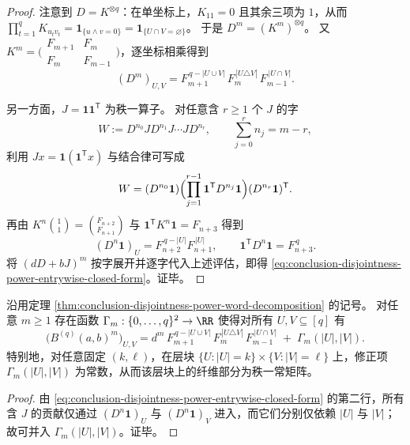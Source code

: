 \begin{proof}
注意到 \(D=K^{\otimes q}\)：在单坐标上，\(K_{11}=0\) 且其余三项为 \(1\)，从而
\(
\prod_{t=1}^{q}K_{u_t v_t}=\mathbf 1_{\{u\wedge v=0\}}=\mathbf 1_{\{U\cap V=\varnothing\}}
\)。
于是 \(D^m=(K^m)^{\otimes q}\)。
又 \(K^m=\bigl(\begin{smallmatrix}F_{m+1}&F_m\\[2pt]F_m&F_{m-1}\end{smallmatrix}\bigr)\)，逐坐标相乘得到
\[
(D^m)_{U,V}=F_{m+1}^{\,q-|U\cup V|}\,F_{m}^{\,|U\triangle V|}\,F_{m-1}^{\,|U\cap V|}.
\]
\par
另一方面，\(J=\mathbf 1\mathbf 1^{\mathsf T}\) 为秩一算子。
对任意含 \(r\ge 1\) 个 \(J\) 的字
\[
W:=D^{n_0}J D^{n_1}J\cdots J D^{n_r},\qquad \sum_{j=0}^{r}n_j=m-r,
\]
利用 \(Jx=\mathbf 1(\mathbf 1^{\mathsf T}x)\) 与结合律可写成
\[
W=(D^{n_0}\mathbf 1)\Bigl(\prod_{j=1}^{r-1}\mathbf 1^{\mathsf T}D^{n_j}\mathbf 1\Bigr)(D^{n_r}\mathbf 1)^{\mathsf T}.
\]
再由
\(
K^n\binom11=\binom{F_{n+2}}{F_{n+1}}
\)
与
\(
\mathbf 1^{\mathsf T}K^n\mathbf 1=F_{n+3}
\)
得到
\[
(D^{n}\mathbf 1)_{U}=F_{n+2}^{\,q-|U|}F_{n+1}^{\,|U|},
\qquad
\mathbf 1^{\mathsf T}D^{n}\mathbf 1=F_{n+3}^{\,q}.
\]
将 \((dD+bJ)^m\) 按字展开并逐字代入上述评估，即得 \eqref{eq:conclusion-disjointness-power-entrywise-closed-form}。证毕。
\end{proof}

\begin{corollary}[层纤维分裂与交并信息的严格解耦]\label{cor:conclusion-disjointness-layer-fiber-decoupling}
沿用定理 \ref{thm:conclusion-disjointness-power-word-decomposition} 的记号。
对任意 \(m\ge 1\) 存在函数 \(\Gamma_m:\{0,\dots,q\}^2\to\RR\) 使得对所有 \(U,V\subseteq[q]\) 有
\[
\bigl(B^{(q)}(a,b)^m\bigr)_{U,V}
=
d^{m}\,F_{m+1}^{\,q-|U\cup V|}\,F_{m}^{\,|U\triangle V|}\,F_{m-1}^{\,|U\cap V|}
\;+\;\Gamma_m(|U|,|V|).
\]
特别地，对任意固定 \((k,\ell)\)，在层块 \(\{U:|U|=k\}\times\{V:|V|=\ell\}\) 上，修正项 \(\Gamma_m(|U|,|V|)\) 为常数，从而该层块上的纤维部分为秩一常矩阵。
\end{corollary}
\begin{proof}
由 \eqref{eq:conclusion-disjointness-power-entrywise-closed-form} 的第二行，所有含 \(J\) 的贡献仅通过 \((D^{n}\mathbf 1)_U\) 与 \((D^{n}\mathbf 1)_V\) 进入，而它们分别仅依赖 \(|U|\) 与 \(|V|\)；故可并入 \(\Gamma_m(|U|,|V|)\)。证毕。
\end{proof}

